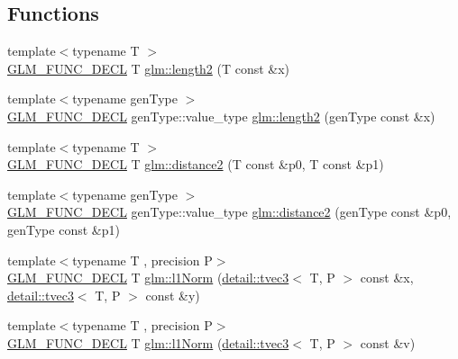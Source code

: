 \subsection*{Functions}
\begin{DoxyCompactItemize}
\item 
{\footnotesize template$<$typename T $>$ }\\\hyperlink{setup_8hpp_ab2d052de21a70539923e9bcbf6e83a51}{G\+L\+M\+\_\+\+F\+U\+N\+C\+\_\+\+D\+E\+CL} T \hyperlink{group__gtx__norm_ga08c670024cd230e22f8b853f185ff533}{glm\+::length2} (T const \&x)
\item 
{\footnotesize template$<$typename gen\+Type $>$ }\\\hyperlink{setup_8hpp_ab2d052de21a70539923e9bcbf6e83a51}{G\+L\+M\+\_\+\+F\+U\+N\+C\+\_\+\+D\+E\+CL} gen\+Type\+::value\+\_\+type \hyperlink{group__gtx__norm_gaa279ba7fdecbed3f9f2b60502b7ec8ca}{glm\+::length2} (gen\+Type const \&x)
\item 
{\footnotesize template$<$typename T $>$ }\\\hyperlink{setup_8hpp_ab2d052de21a70539923e9bcbf6e83a51}{G\+L\+M\+\_\+\+F\+U\+N\+C\+\_\+\+D\+E\+CL} T \hyperlink{group__gtx__norm_ga3544f6288d3bce2cf2a9f6ebe39e0557}{glm\+::distance2} (T const \&p0, T const \&p1)
\item 
{\footnotesize template$<$typename gen\+Type $>$ }\\\hyperlink{setup_8hpp_ab2d052de21a70539923e9bcbf6e83a51}{G\+L\+M\+\_\+\+F\+U\+N\+C\+\_\+\+D\+E\+CL} gen\+Type\+::value\+\_\+type \hyperlink{group__gtx__norm_gaec2d9df62436879b48207d39516f3788}{glm\+::distance2} (gen\+Type const \&p0, gen\+Type const \&p1)
\item 
{\footnotesize template$<$typename T , precision P$>$ }\\\hyperlink{setup_8hpp_ab2d052de21a70539923e9bcbf6e83a51}{G\+L\+M\+\_\+\+F\+U\+N\+C\+\_\+\+D\+E\+CL} T \hyperlink{group__gtx__norm_gae7c48d18df3e4a9c13bb9c003e434d5f}{glm\+::l1\+Norm} (\hyperlink{structglm_1_1detail_1_1tvec3}{detail\+::tvec3}$<$ T, P $>$ const \&x, \hyperlink{structglm_1_1detail_1_1tvec3}{detail\+::tvec3}$<$ T, P $>$ const \&y)
\item 
{\footnotesize template$<$typename T , precision P$>$ }\\\hyperlink{setup_8hpp_ab2d052de21a70539923e9bcbf6e83a51}{G\+L\+M\+\_\+\+F\+U\+N\+C\+\_\+\+D\+E\+CL} T \hyperlink{group__gtx__norm_ga466d01e7b4350f44250d80ec48128fbd}{glm\+::l1\+Norm} (\hyperlink{structglm_1_1detail_1_1tvec3}{detail\+::tvec3}$<$ T, P $>$ const \&v)
\item 

\end{DoxyCompactItemize}
